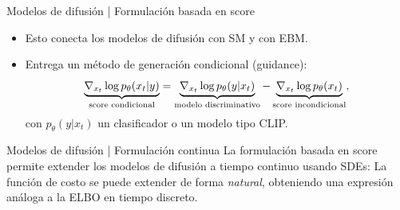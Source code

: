 \documentclass[aspectratio=43, 10pt]{beamer} %
\begin{document}
\begin{frame}{Modelos de difusión | Formulación basada en score}
    \begin{itemize}
        \item<2> Esto conecta los modelos de difusión con SM y con EBM.
        \item<3> Entrega un método de generación condicional (guidance):
              \begin{equation*}
                  \underbrace{\nabla_{x_t} \log p_\theta(x_t|y)}_{\text{score condicional}} = \underbrace{\nabla_{x_t} \log p_\theta(y|x_t)}_{\text{modelo discriminativo}} - \underbrace{\nabla_{x_t} \log p_\theta(x_t)}_{\text{score incondicional}},
              \end{equation*}
              con $p_\theta(y|x_t)$ un clasificador o un modelo tipo CLIP.
    \end{itemize}
\end{frame}

\begin{frame}{Modelos de difusión | Formulación continua}
    La formulación basada en score permite extender los modelos de difusión a tiempo continuo usando SDEs:
    La función de costo se puede extender de forma \textit{natural}, obteniendo una expresión análoga a la ELBO en tiempo discreto.
\end{frame}
\end{document}
